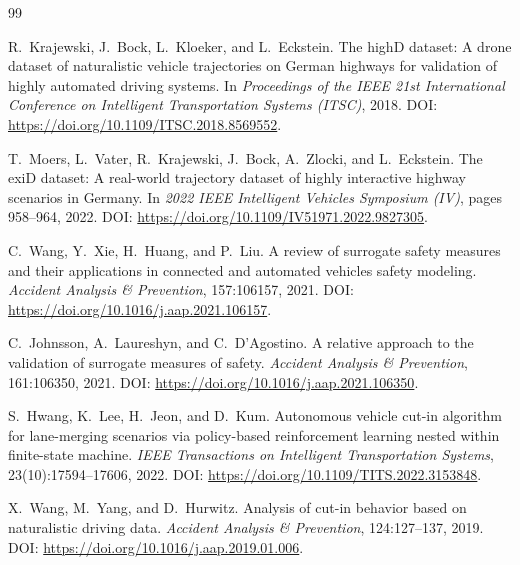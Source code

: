 \documentclass[12pt,a4paper,twoside,openright]{report}
\begin{document}
    \cleardoublepage
    \begin{thebibliography}{99}

        R.~Krajewski, J.~Bock, L.~Kloeker, and L.~Eckstein.
        \newblock The highD dataset: A drone dataset of naturalistic vehicle trajectories on German highways for validation of highly automated driving systems.
        \newblock In \emph{Proceedings of the IEEE 21st International Conference on Intelligent Transportation Systems (ITSC)}, 2018.
        \newblock DOI: \url{https://doi.org/10.1109/ITSC.2018.8569552}.

        T.~Moers, L.~Vater, R.~Krajewski, J.~Bock, A.~Zlocki, and L.~Eckstein.
        \newblock The exiD dataset: A real-world trajectory dataset of highly interactive highway scenarios in Germany.
        \newblock In \emph{2022 IEEE Intelligent Vehicles Symposium (IV)}, pages 958--964, 2022.
        \newblock DOI: \url{https://doi.org/10.1109/IV51971.2022.9827305}.

        C.~Wang, Y.~Xie, H.~Huang, and P.~Liu.
        \newblock A review of surrogate safety measures and their applications in connected and automated vehicles safety modeling.
        \newblock \emph{Accident Analysis \& Prevention}, 157:106157, 2021.
        \newblock DOI: \url{https://doi.org/10.1016/j.aap.2021.106157}.

        C.~Johnsson, A.~Laureshyn, and C.~D'Agostino.
        \newblock A relative approach to the validation of surrogate measures of safety.
        \newblock \emph{Accident Analysis \& Prevention}, 161:106350, 2021.
        \newblock DOI: \url{https://doi.org/10.1016/j.aap.2021.106350}.

        S.~Hwang, K.~Lee, H.~Jeon, and D.~Kum.
        \newblock Autonomous vehicle cut-in algorithm for lane-merging scenarios via policy-based reinforcement learning nested within finite-state machine.
        \newblock \emph{IEEE Transactions on Intelligent Transportation Systems}, 23(10):17594--17606, 2022.
        \newblock DOI: \url{https://doi.org/10.1109/TITS.2022.3153848}.

        X.~Wang, M.~Yang, and D.~Hurwitz.
        \newblock Analysis of cut-in behavior based on naturalistic driving data.
        \newblock \emph{Accident Analysis \& Prevention}, 124:127--137, 2019.
        \newblock DOI: \url{https://doi.org/10.1016/j.aap.2019.01.006}.


\end{thebibliography}
\end{document}
